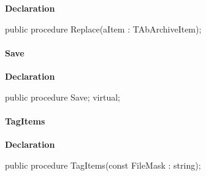 \documentclass{report}
\newif\ifpdf
\begin{document}
\label{AbArcTyp.TAbArchive-Replace}
\begin{list}{}{
\setlength{\itemindent}{0cm}
\setlength{\listparindent}{0cm}
\setlength{\leftmargin}{\evensidemargin}
\addtolength{\leftmargin}{\tmplength}
\settowidth{\labelsep}{X}
\addtolength{\leftmargin}{\labelsep}
\setlength{\labelwidth}{\tmplength}
}
\item[\textbf{Declaration}\hfill]
\ifpdf
\begin{flushleft}
\fi
\begin{ttfamily}
public procedure Replace(aItem : TAbArchiveItem);\end{ttfamily}

\ifpdf
\end{flushleft}
\fi

\end{list}
\paragraph*{Save}\hspace*{\fill}

\label{AbArcTyp.TAbArchive-Save}
\begin{list}{}{
\setlength{\itemindent}{0cm}
\setlength{\listparindent}{0cm}
\setlength{\leftmargin}{\evensidemargin}
\addtolength{\leftmargin}{\tmplength}
\settowidth{\labelsep}{X}
\addtolength{\leftmargin}{\labelsep}
\setlength{\labelwidth}{\tmplength}
}
\item[\textbf{Declaration}\hfill]
\ifpdf
\begin{flushleft}
\fi
\begin{ttfamily}
public procedure Save; virtual;\end{ttfamily}

\ifpdf
\end{flushleft}
\fi

\end{list}
\paragraph*{TagItems}\hspace*{\fill}

\label{AbArcTyp.TAbArchive-TagItems}
\begin{list}{}{
\setlength{\itemindent}{0cm}
\setlength{\listparindent}{0cm}
\setlength{\leftmargin}{\evensidemargin}
\addtolength{\leftmargin}{\tmplength}
\settowidth{\labelsep}{X}
\addtolength{\leftmargin}{\labelsep}
\setlength{\labelwidth}{\tmplength}
}
\item[\textbf{Declaration}\hfill]
\ifpdf
\begin{flushleft}
\fi
\begin{ttfamily}
public procedure TagItems(const FileMask : string);\end{ttfamily}

\ifpdf
\end{flushleft}
\fi

\end{list}
\end{document}
